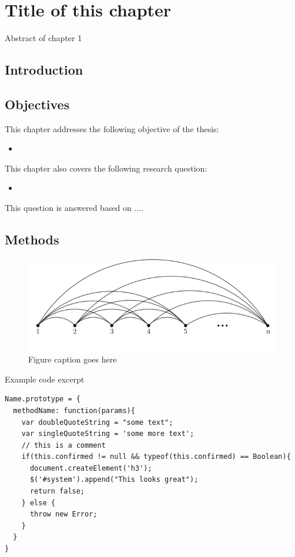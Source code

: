 \chapter{Title of this chapter}
\label{chapter:something}


Abstract of chapter 1

\section{Introduction}


\section{Objectives}
\label{section:ch03:objectives}

This chapter addresses the following objective of the thesis:

\begin{itemize}
    \item \textit{}

\end{itemize}


This chapter also covers the following research question:

\begin{itemize}
    \item \textit{}
\end{itemize}

This question is answered based on ....

\section{Methods}

\begin{figure}[H]
\centering
\includegraphics[width=\textwidth]{figures/sample_graph.png}
\caption{Figure caption goes here}

\end{figure}

Example code excerpt
\begin{lstlisting} 
Name.prototype = {
  methodName: function(params){
    var doubleQuoteString = "some text";
    var singleQuoteString = 'some more text';
    // this is a comment
    if(this.confirmed != null && typeof(this.confirmed) == Boolean){
      document.createElement('h3');
      $('#system').append("This looks great");
      return false;
    } else {
      throw new Error;
    }
  }
}
\end{lstlisting}

